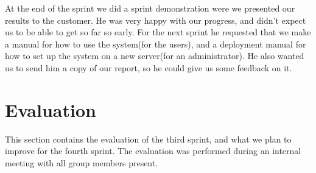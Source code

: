 \newline
\newline
At the end of the sprint we did a sprint demonstration were we presented our results to the customer. He was very happy with our progress, and didn't expect us to be able to get so far so early. For the next sprint he requested that we make a manual for how to use the system(for the users), and a deployment manual for how to set up the system on a new server(for an administrator). He also wanted us to send him a copy of our report, so he could give us some feedback on it.

\section{Evaluation}
This section contains the evaluation of the third sprint, and what we plan to improve for the fourth sprint. The evaluation was performed during an internal meeting with all group members present.

